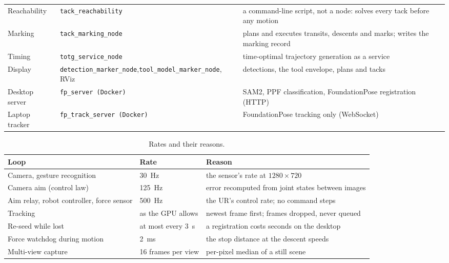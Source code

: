 \begin{table}[htbp]
\begin{tabular}{@{}L{0.17\textwidth}>{\footnotesize}L{0.31\textwidth}L{0.44\textwidth}@{}}
Reachability & \texttt{tack\_\allowbreak{}reachability} & a command-line script, not a node: solves every tack before any motion \\
Marking & \texttt{tack\_\allowbreak{}marking\_\allowbreak{}node} & plans and executes transits, descents and marks; writes the marking record \\
Timing & \texttt{totg\_\allowbreak{}service\_\allowbreak{}node} & time-optimal trajectory generation as a service \\
Display & \texttt{detection\_\allowbreak{}marker\_\allowbreak{}node},\newline\texttt{tool\_\allowbreak{}model\_\allowbreak{}marker\_\allowbreak{}node}, RViz & detections, the tool envelope, plans and tacks \\
Desktop server & \texttt{fp\_\allowbreak{}server (Docker)} & SAM2, PPF classification, FoundationPose registration (HTTP) \\
Laptop tracker & \texttt{fp\_\allowbreak{}track\_\allowbreak{}server (Docker)} & FoundationPose tracking only (WebSocket) \\
\bottomrule
\end{tabular}
\end{table}
\begin{table}[htbp]
\caption{Rates and their reasons.}
\label{tab:rates}
\centering\small
\begin{tabular}{@{}L{0.34\textwidth}L{0.14\textwidth}L{0.44\textwidth}@{}}
\toprule
Loop & Rate & Reason \\
\midrule
Camera, gesture recognition & 30~Hz & the sensor's rate at $1280\times720$ \\
Camera aim (control law) & 125~Hz & error recomputed from joint states between images \\
Aim relay, robot controller, force sensor & 500~Hz & the UR's control rate; no command steps \\
Tracking & as the GPU allows & newest frame first; frames dropped, never queued \\
Re-seed while lost & at most every 3~s & a registration costs seconds on the desktop \\
Force watchdog during motion & 2~ms & the stop distance at the descent speeds \\
Multi-view capture & 16 frames per view & per-pixel median of a still scene \\
\bottomrule
\end{tabular}
\end{table}


